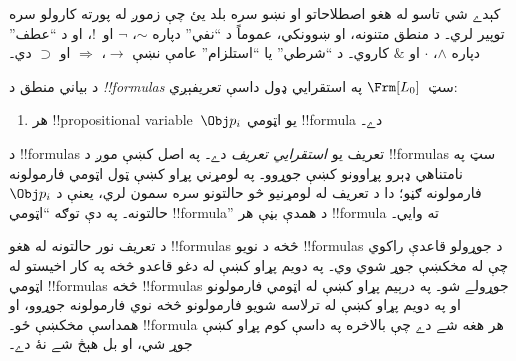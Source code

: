 \documentclass[../../../include/open-logic-section]{subfiles}
\begin{document}
\begin{intro}
کېدے شي تاسو له هغو اصطلاحاتو او نښو سره بلد يئ چې زموږ له پورته
کارولو سره توپير لري۔ د منطق متنونه، او ښوونکي، عموماً د ``نفي''
دپاره $\sim$، $\neg$ او~!، او د ``عطف'' دپاره $\wedge$، $\cdot$ او
$\&$ کاروي۔ د ``شرطي'' يا ``استلزام'' عامې نښې $\rightarrow$،
$\Rightarrow$ او $\supset$ دي۔
\end{intro}

\begin{defn}[فارمول]
د بياني منطق د \emph{!!{formula}s} سټ~$\Frm[L_0]$ په استقرايي ډول
داسې تعريفېږي:
\begin{enumerate}


\item هر !!{propositional variable}~$\Obj p_i$ يو اټومي
  !!{formula} دے۔






\end{enumerate}
\end{defn}

\begin{explain}
د !!{formula}s تعريف يو \emph{استقرايي تعريف} دے۔ په اصل کښې موږ
د !!{formula}s سټ په نامتناهي ډېرو پړاوونو کښې جوړوو۔ په لومړني
پړاو کښې ټول اټومي فارمولونه فارمولونه ګڼو؛ دا د تعريف له لومړنيو
څو حالتونو سره سمون لري، يعنې د
%
%
$\Obj p_i$ حالتونه۔ په دې توګه ``اټومي !!{formula}'' د همدې بڼې هر
!!{formula} ته وايي۔

د تعريف نور حالتونه له هغو !!{formula}s څخه د نويو !!{formula}s د
جوړولو قاعدې راکوي چې له مخکښې جوړ شوي وي۔ په دويم پړاو کښې له دغو
قاعدو څخه په کار اخيستو له اټومي !!{formula}s څخه !!{formula}s
جوړولے شو۔ په درېيم پړاو کښې له اټومي فارمولونو او په دويم پړاو کښې
له ترلاسه شويو فارمولونو څخه نوي فارمولونه جوړوو، او همداسې مخکښې
ځو۔ !!{formula} هر هغه شے دے چې بالاخره په داسې کوم پړاو کښې جوړ
شي، او بل هېڅ شے نۀ دے۔
\end{explain}
\end{document}
